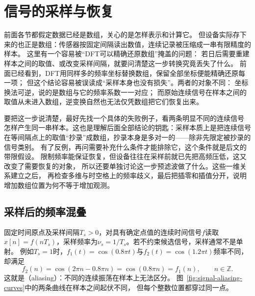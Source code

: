 \section{信号的采样与恢复}
\label{sec:signal-analysis-sampling}

前面各节都假定数据已经是数组，关心的是怎样表示和计算它。
但设备实际存下来的也正是数组：传感器按固定间隔读出数值，连续记录被压缩成一串有限精度的样本。
这里有一个容易被“DFT可以精确还原数组”掩盖的问题：
若日后需要重建样本之间的取值、或改变采样间隔，就要问清楚这一步转换究竟丢失了什么。
前面已经看到，DFT用同样多的频率坐标替换数组，保留全部坐标便能精确还原每一项；
但这个结论容易被误读成“采样本身也没有损失”。两者的对象不同：
坐标换法可逆，说的是数组与它的频率系数一一对应；
而原始连续信号在样本之间的取值从未进入数组，逆变换自然也无法仅凭数组把它们恢复出来。

要把这一步说清楚，最好先找一个具体的失败例子，看两条明显不同的连续信号
怎样产生同一串样本。这也是理解后面全部结论的钥匙：采样本质上是把连续信号
在等间隔点上的取值“抄录”成数组，抄录本身是多对一的——除非先限定被抄录的信号类别。
有了反例，再问需要补充什么条件才能排除它，这个条件就是后文的带限假设。
限制频率能保证恢复，但设备往往在采样前就已先把高频压低，这又改变了需要恢复的对象，
所以还要单独讨论这一步预滤波做了什么。这些一维关系建立之后，
再检查多维与时空格上的频率歧义，最后把插零和插值分开，说明增加数组位置为何不等于增加观测。

\subsection{采样后的频率混叠}
\label{sec:signal-sampling-ambiguity}

固定时间原点及采样间隔$T_s>0$，对具有确定点值的连续时间信号$f$读取
$x[n]=f(nT_s)$，采样频率为$\nu_s=1/T_s$。若不约束候选信号，采样通常不是单射。
例如$T_s=1$时，$f_1(t)=\cos(0.8\pi t)$与$f_2(t)=\cos(1.2\pi t)$频率不同，却满足
\[
  f_2(n)=\cos(2\pi n-0.8\pi n)=\cos(0.8\pi n)=f_1(n),
  \qquad n\in\mathbb Z.
\]
这就是（aliasing）：不同的连续振荡在样本上无法区分。
图~\ref{fig:signal-aliasing-curves}中的两条曲线在样本之间起伏不同，
但每个整数位置都穿过同一点。

